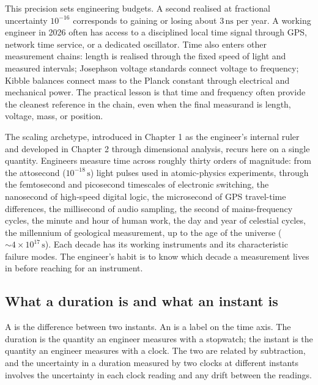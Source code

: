 This precision sets engineering budgets. A second realised at
fractional uncertainty $10^{-16}$ corresponds to gaining or losing
about $3 \,\si{\nano\second}$ per year. A working engineer in 2026
often has access to a disciplined local time signal through GPS,
network time service, or a dedicated oscillator. Time also enters
other measurement chains: length is realised through the fixed
speed of light and measured intervals; Josephson voltage standards
connect voltage to frequency; Kibble balances connect mass to the
Planck constant through electrical and mechanical power. The
practical lesson is that time and frequency often provide the
cleanest reference in the chain, even when the final measurand is
length, voltage, mass, or position.

\begin{archetype}
The scaling archetype, introduced in Chapter 1 as the engineer's
internal ruler and developed in Chapter 2 through dimensional
analysis, recurs here on a single quantity. Engineers measure time
across roughly thirty orders of magnitude: from the attosecond
($10^{-18} \,\si{\second}$) light pulses used in atomic-physics
experiments, through the femtosecond and picosecond timescales of
electronic switching, the nanosecond of high-speed digital logic,
the microsecond of GPS travel-time differences, the millisecond of
audio sampling, the second of mains-frequency cycles, the minute and
hour of human work, the day and year of celestial cycles, the
millennium of geological measurement, up to the age of the universe
($\sim 4 \times 10^{17} \,\si{\second}$). Each decade has its
working instruments and its characteristic failure modes. The
engineer's habit is to know which decade a measurement lives in
before reaching for an instrument.
\end{archetype}

\subsection{What a duration is and what an instant is}

A  is the difference between two instants. An
 is a label on the time axis. The duration is the
quantity an engineer measures with a stopwatch; the instant is the
quantity an engineer measures with a clock. The two are related by
subtraction, and the uncertainty in a duration measured by two
clocks at different instants involves the uncertainty in each clock
reading and any drift between the readings.

